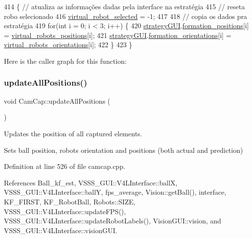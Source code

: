 \begin{DoxyCode}
414                                           \{ \textcolor{comment}{// atualiza as informações dadas pela interface na estratégia}
415     \textcolor{comment}{// reseta robo selecionado}
416     \hyperlink{class_cam_cap_a6709fb57a514b9aa6ee943b2b57fdbe7}{virtual\_robot\_selected} = -1;
417 
418     \textcolor{comment}{// copia os dados pra estratégia}
419     \textcolor{keywordflow}{for}(\textcolor{keywordtype}{int} i = 0; i < 3; i++) \{
420         \hyperlink{class_cam_cap_a71ae899fee6c1b02de3c373965208e52}{strategyGUI}.\hyperlink{class_strategy_g_u_i_a4d2d15fe0a25b8d9d8fa56a4cf155ff0}{formation\_positions}[i] = 
      \hyperlink{class_cam_cap_afdbec56c1e17c308441cf2eaad035e45}{virtual\_robots\_positions}[i];
421         \hyperlink{class_cam_cap_a71ae899fee6c1b02de3c373965208e52}{strategyGUI}.\hyperlink{class_strategy_g_u_i_ad8d7e6bbfceba5d6284c8825f37ea8a2}{formation\_orientations}[i] = 
      \hyperlink{class_cam_cap_af7519e2b0d2139c7ef95482fa3c03c20}{virtual\_robots\_orientations}[i];
422     \}
423 \}
\end{DoxyCode}
Here is the caller graph for this function\+:
\mbox{\label{class_cam_cap_afc272fe8b0ddc82386dbf827aed7db78}} 
\subsubsection{\texorpdfstring{update\+All\+Positions()}{updateAllPositions()}}
{\footnotesize\ttfamily void Cam\+Cap\+::update\+All\+Positions (\begin{DoxyParamCaption}{ }\end{DoxyParamCaption})}



Updates the position of all captured elements. 

Sets ball position, robot\textquotesingle{}s orientation and positions (both actual and prediction) 

Definition at line 526 of file camcap.\+cpp.



References Ball\+\_\+kf\+\_\+est, V\+S\+S\+S\+\_\+\+G\+U\+I\+::\+V4\+L\+Interface\+::ballX, V\+S\+S\+S\+\_\+\+G\+U\+I\+::\+V4\+L\+Interface\+::ballY, fps\+\_\+average, Vision\+::get\+Ball(), interface, K\+F\+\_\+\+F\+I\+R\+ST, K\+F\+\_\+\+Robot\+Ball, Robots\+::\+S\+I\+ZE, V\+S\+S\+S\+\_\+\+G\+U\+I\+::\+V4\+L\+Interface\+::update\+F\+P\+S(), V\+S\+S\+S\+\_\+\+G\+U\+I\+::\+V4\+L\+Interface\+::update\+Robot\+Labels(), Vision\+G\+U\+I\+::vision, and V\+S\+S\+S\+\_\+\+G\+U\+I\+::\+V4\+L\+Interface\+::vision\+G\+UI.



